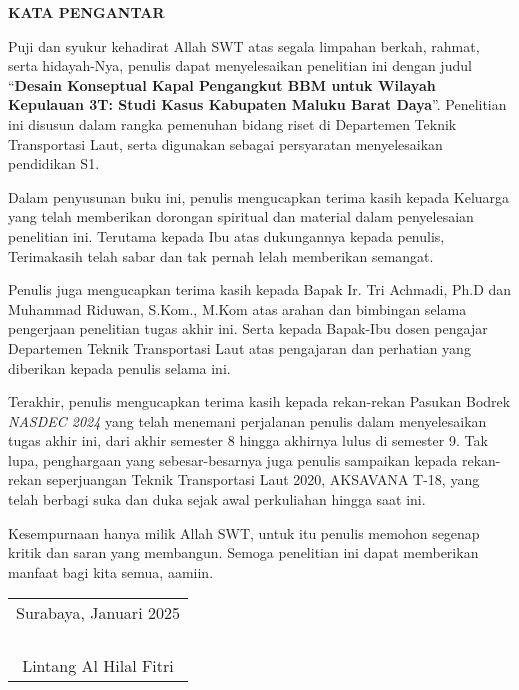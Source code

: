 \begin{center}
  \Large
  \textbf{KATA PENGANTAR}
\end{center}

\vspace{2ex}

Puji dan syukur kehadirat Allah SWT atas segala limpahan berkah, rahmat, serta hidayah-Nya, penulis  dapat menyelesaikan penelitian ini dengan judul
``\textbf{Desain Konseptual Kapal Pengangkut BBM untuk Wilayah Kepulauan 3T: Studi Kasus Kabupaten Maluku Barat Daya}''.
Penelitian ini disusun dalam rangka pemenuhan bidang riset di Departemen Teknik Transportasi Laut,
  serta digunakan sebagai persyaratan menyelesaikan pendidikan S1.

Dalam penyusunan buku ini,
  penulis mengucapkan terima kasih kepada Keluarga yang telah memberikan dorongan spiritual dan material dalam penyelesaian penelitian ini.
Terutama kepada Ibu atas dukungannya kepada penulis, Terimakasih telah sabar dan tak pernah lelah memberikan semangat.

Penulis juga mengucapkan terima kasih kepada Bapak Ir. Tri Achmadi, Ph.D 
  dan Muhammad Riduwan, S.Kom., M.Kom atas arahan dan bimbingan selama pengerjaan penelitian tugas akhir ini.
Serta kepada Bapak-Ibu dosen pengajar Departemen Teknik Transportasi Laut atas pengajaran dan perhatian yang diberikan kepada penulis selama ini.

Terakhir, penulis mengucapkan terima kasih kepada rekan-rekan Pasukan Bodrek \emph{NASDEC 2024} yang telah menemani perjalanan penulis dalam menyelesaikan tugas akhir ini, dari akhir semester 8 hingga akhirnya lulus di semester 9. Tak lupa, penghargaan yang sebesar-besarnya juga penulis sampaikan kepada rekan-rekan seperjuangan Teknik Transportasi Laut 2020, AKSAVANA T-18, yang telah berbagi suka dan duka sejak awal perkuliahan hingga saat ini.

Kesempurnaan hanya milik Allah SWT, untuk itu penulis memohon segenap kritik dan saran yang  membangun.
Semoga penelitian ini dapat memberikan manfaat bagi kita semua, aamiin.

\vspace{4ex}

\begin{flushright}
  \begin{tabular}[b]{c}
    Surabaya, Januari 2025\\
    \\
    \\
    \\
    \\
    Lintang Al Hilal Fitri
  \end{tabular}
\end{flushright}
